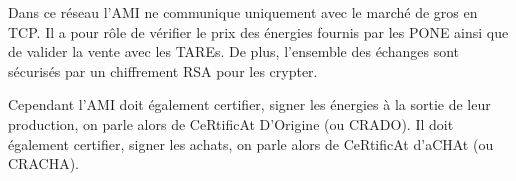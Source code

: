 Dans ce réseau l'AMI ne communique uniquement avec le marché de gros en TCP. Il a pour rôle de vérifier le prix des énergies fournis par les PONE ainsi que de valider la vente avec les TAREs. De plus, l'ensemble des échanges sont sécurisés par un chiffrement RSA pour les crypter. 

Cependant l'AMI doit également certifier, signer les énergies à la sortie de leur production, on parle alors de CeRtificAt D'Origine (ou CRADO). Il doit également certifier, signer les achats, on parle alors de CeRtificAt d'aCHAt (ou CRACHA).
\newpage